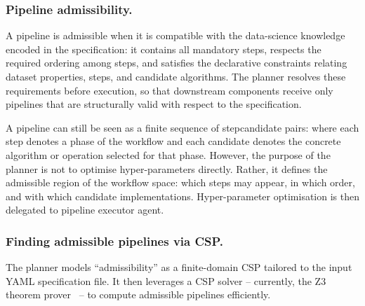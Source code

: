 \documentclass[runningheads]{llncs}
\begin{document}
\subsubsection{Pipeline admissibility.}
%
A pipeline is admissible when it is compatible with the data-science knowledge encoded in the specification:
it contains all mandatory steps,
respects the required ordering among steps,
and satisfies the declarative constraints relating dataset properties,
steps,
and candidate algorithms.
%
%
The planner resolves these requirements before execution,
so that downstream components receive only pipelines that are structurally valid with respect to the specification.

A pipeline can still be seen as a finite sequence of step\textendash{}candidate pairs:
where each step denotes a phase of the workflow
and each candidate denotes the concrete algorithm or operation selected for that phase.
%
However,
the purpose of the planner is not to optimise hyper-parameters directly.
%
Rather,
it defines the admissible region of the workflow space:
which steps may appear,
in which order,
and with which candidate implementations.
%
Hyper-parameter optimisation is then delegated to pipeline executor agent.

\subsubsection{Finding admissible pipelines via \acs{CSP}.}

The planner models ``admissibility'' as a finite-domain \ac{CSP}
tailored to the input YAML specification file.
%
It then leverages a \ac{CSP} solver
-- currently, the Z3 theorem prover~\cite{DBLP:conf/tacas/MouraB08} --
to compute admissible pipelines efficiently.
\end{document}
